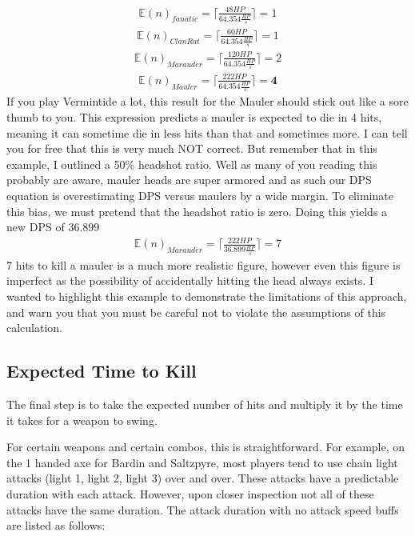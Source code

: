 \documentclass{article}
\begin{document}
\begin{align*}
\mathbb{E}(n)_{fanatic} = \lceil \frac{48HP}{64.354\tfrac{HP}{s}} \rceil = 1
\end{align*}
\begin{align*}
\mathbb{E}(n)_{Clan Rat} = \lceil \frac{60HP}{64.354\tfrac{HP}{s}} \rceil = 1
\end{align*}
\begin{align*}
\mathbb{E}(n)_{Marauder} = \lceil \frac{120HP}{64.354\tfrac{HP}{s}} \rceil = 2
\end{align*}
\begin{align*}
\mathbb{E}(n)_{Mauler} = \lceil \frac{222HP}{64.354\tfrac{HP}{s}} \rceil = \textbf{4}
\end{align*}
If you play Vermintide a lot, this result for the Mauler should stick out like a sore thumb to you. This expression predicts a mauler is expected to die in 4 hits, meaning it can sometime die in less hits than that and sometimes more. I can tell you for free that this is very much NOT correct. But remember that in this example, I outlined a 50\% headshot ratio. Well as many of you reading this probably are aware, mauler heads are super armored and as such our DPS equation is overestimating DPS versus maulers by a wide margin. To eliminate this bias, we must pretend that the headshot ratio is zero. Doing this yields a new DPS of $36.899$
\begin{align*}
\mathbb{E}(n)_{Marauder} = \lceil \frac{222HP}{36.899\tfrac{HP}{s}} \rceil = 7
\end{align*}
7 hits to kill a mauler is a much more realistic figure, however even this figure is imperfect as the possibility of accidentally hitting the head always exists. I wanted to highlight this example to demonstrate the limitations of this approach, and warn you that you must be careful not to violate the assumptions of this calculation.

\pagebreak

\subsection{Expected Time to Kill}

The final step is to take the expected number of hits and multiply it by the time it takes for a weapon to swing.

For certain weapons and certain combos, this is straightforward. For example, on the 1 handed axe for Bardin and Saltzpyre, most players tend to use chain light attacks (light 1, light 2, light 3) over and over. These attacks have a predictable duration with each attack. However, upon closer inspection not all of these attacks have the same duration. The attack duration with no attack speed buffs are listed as follows:
\end{document}
